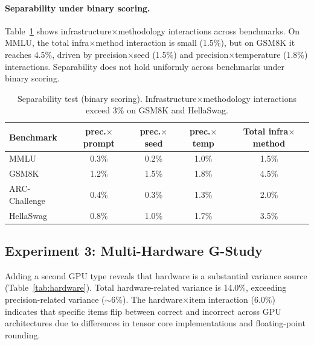 \documentclass[11pt]{article}
\begin{document}
\paragraph{Separability under binary scoring.}
Table~\ref{tab:separability} shows infrastructure$\times$methodology interactions across benchmarks.
On MMLU, the total infra$\times$method interaction is small (1.5\%), but on GSM8K it reaches 4.5\%, driven by precision$\times$seed (1.5\%) and precision$\times$temperature (1.8\%) interactions.
Separability does not hold uniformly across benchmarks under binary scoring.

\begin{table}[t]
\centering
\caption{Separability test (binary scoring). Infrastructure$\times$methodology interactions exceed 3\% on GSM8K and HellaSwag.}
\label{tab:separability}
\begin{tabular}{lcccc}
\toprule
Benchmark & prec.$\times$prompt & prec.$\times$seed & prec.$\times$temp & Total infra$\times$method \\
\midrule
MMLU         & 0.3\% & 0.2\% & 1.0\% & 1.5\% \\
GSM8K        & 1.2\% & 1.5\% & 1.8\% & 4.5\% \\
ARC-Challenge& 0.4\% & 0.3\% & 1.3\% & 2.0\% \\
HellaSwag    & 0.8\% & 1.0\% & 1.7\% & 3.5\% \\
\bottomrule
\end{tabular}
\end{table}

\subsection{Experiment 3: Multi-Hardware G-Study}
\label{sec:exp3}

Adding a second GPU type reveals that hardware is a substantial variance source (Table~\ref{tab:hardware}).
Total hardware-related variance is 14.0\%, exceeding precision-related variance ($\sim$6\%).
The hardware$\times$item interaction (6.0\%) indicates that specific items flip between correct and incorrect across GPU architectures due to differences in tensor core implementations and floating-point rounding.
\end{document}
